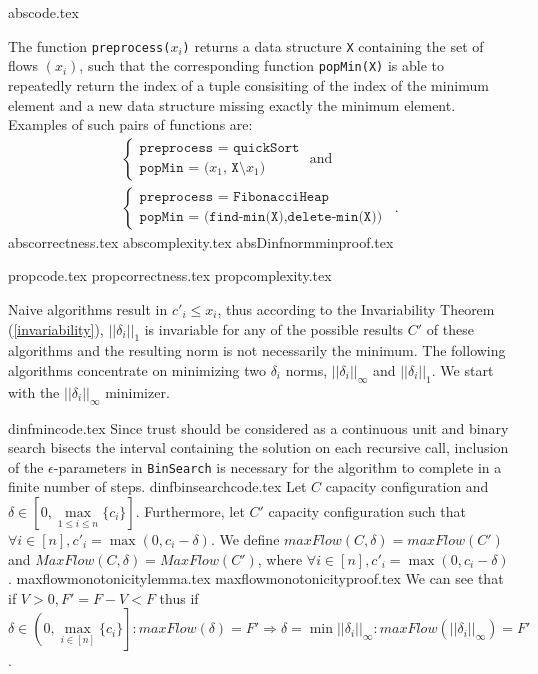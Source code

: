 \documentclass[11pt]{llncs}
\begin{document}
  {abscode.tex}

  The function \texttt{preprocess(}$x_i$\texttt{)} returns a data structure \texttt{X} containing the set of flows
  $\left(x_i\right)$, such that the corresponding function \texttt{popMin(X)} is able to repeatedly return the index of a
  tuple consisiting of the index of the minimum element and a new data structure missing exactly the minimum element.
  Examples of such pairs of functions are:
  \begin{equation*}
  \begin{gathered}
    \begin{cases}
      \texttt{preprocess = quickSort} \\
      \texttt{popMin = (}x_1\texttt{, X}\setminus x_1\texttt{)}
    \end{cases}
    \mbox{ and} \\
    \begin{cases}
      \texttt{preprocess = FibonacciHeap} \\
      \texttt{popMin = (find-min(X),delete-min(X))}
    \end{cases} \enspace.
  \end{gathered}
  \end{equation*}
  {abscorrectness.tex}
  {abscomplexity.tex}
  {absDinfnormminproof.tex}

  {propcode.tex}
  {propcorrectness.tex}
  {propcomplexity.tex}

  Naive algorithms result in $c'_i \leq x_i$, thus according to the Invariability Theorem (\ref{invariability}),
  $||\delta_i||_1$ is invariable for any of the possible results $C'$ of these algorithms and the resulting norm is not
  necessarily the minimum. The following algorithms concentrate on minimizing two $\delta_i$ norms, $||\delta_i||_\infty$ and
  $||\delta_i||_1$. We start with the $||\delta_i||_\infty$ minimizer.

  {dinfmincode.tex}
  Since trust should be considered as a continuous unit and binary search bisects the interval containing the solution
  on each recursive call, inclusion of the $\epsilon$-parameters in \texttt{BinSearch} is necessary for the algorithm to
  complete in a finite number of steps.
  {dinfbinsearchcode.tex}
  Let $C$ capacity configuration and $\delta \in [0, \max\limits_{1 \leq i \leq n}{\{c_i\}}]$. Furthermore, let $C'$ capacity
  configuration such that $\forall i \in [n], c'_i = \max{\left(0, c_i - \delta\right)}$. We define
  $maxFlow\left(C, \delta\right) = maxFlow\left(C'\right)$ and $MaxFlow\left(C, \delta\right) = MaxFlow\left(C'\right)$,
  where $\forall i \in [n], c'_i = \max{\left(0, c_i - \delta\right)}$. 
  {maxflowmonotonicitylemma.tex}
  {maxflowmonotonicityproof.tex}
  We can see that if $V > 0, F' = F - V < F$ thus if $\delta \in \left(0, \max\limits_{i \in [n]}\{c_i\}\right]:
  maxFlow\left(\delta\right) = F' \Rightarrow \delta = \min||\delta_i||_\infty :
  maxFlow\left(||\delta_{i}||_{\infty}\right) = F'$.
\end{document}
